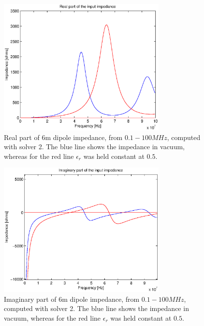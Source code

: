 \documentclass[two-coloumn,ras]{agutex}
\begin{document}
\begin{article}
\begin{figure}
  \noindent\includegraphics[width=20pc]{imps_dipole_solver2_real.eps}
\caption{Real part of 6m dipole impedance, from $0.1 - 100 MHz$, computed with solver 2. The blue line shows the impedance in vacuum, whereas for the red line $\epsilon_r$ was held constant at $0.5$.}
\label{fig:impedances_dipole_solver2_real}
\end{figure}

\begin{figure}
\noindent\includegraphics[width=20pc]{imps_dipole_solver2_imag.eps}
\caption{Imaginary part of 6m dipole impedance, from $0.1 - 100 MHz$, computed with solver 2. The blue line shows the impedance in vacuum, whereas for the red line $\epsilon_r$ was held constant at $0.5$.}
\label{fig:impedances_dipole_solver2_imag}
\end{figure}


\end{article}
\end{document}
